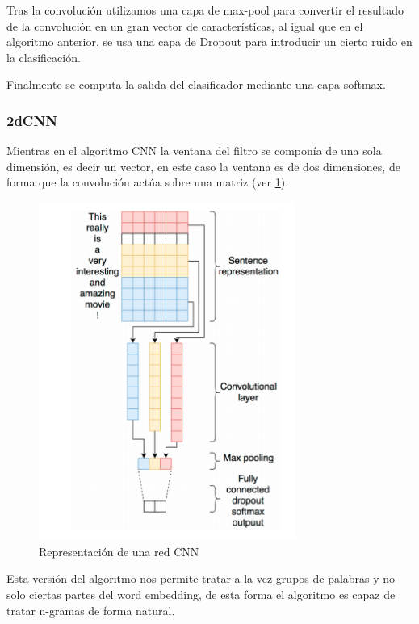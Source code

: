 Tras la convolución utilizamos una capa de max-pool para convertir el resultado de la convolución en un gran vector de características, al igual que en el algoritmo anterior, se usa una capa de Dropout para introducir un cierto ruido en la clasificación.

Finalmente se computa la salida del clasificador mediante una capa softmax.

\subsubsection{2dCNN}

Mientras en el algoritmo CNN la ventana del filtro se componía de una sola dimensión, es decir un vector, en este caso la ventana es de dos dimensiones, de forma que la convolución actúa sobre una matriz (ver \ref{2cnn}).

\begin{figure}[!ht]
	\centering
	\includegraphics[width=0.75\textwidth]{imaxes/cnn.png}
	\caption{Representación de una red CNN}
	\label{2cnn}
\end{figure}

Esta versión del algoritmo nos permite tratar a la vez grupos de palabras y no solo ciertas partes del word embedding, de esta forma el algoritmo es capaz de tratar n-gramas de forma natural.


